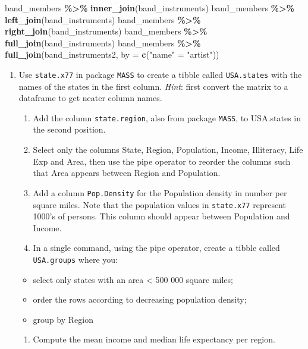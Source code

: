 \documentclass[
]{book}
\newenvironment{Shaded}{\begin{snugshade}}{\end{snugshade}}
\newcommand{\AttributeTok}[1]{\textcolor[rgb]{0.13,0.29,0.53}{#1}}
\newcommand{\FunctionTok}[1]{\textcolor[rgb]{0.13,0.29,0.53}{\textbf{#1}}}
\newcommand{\NormalTok}[1]{#1}
\newcommand{\OtherTok}[1]{\textcolor[rgb]{0.56,0.35,0.01}{#1}}
\newcommand{\SpecialCharTok}[1]{\textcolor[rgb]{0.81,0.36,0.00}{\textbf{#1}}}
\newcommand{\StringTok}[1]{\textcolor[rgb]{0.31,0.60,0.02}{#1}}
\providecommand{\tightlist}{%
  \setlength{\itemsep}{0pt}\setlength{\parskip}{0pt}}
\begin{document}
\begin{Shaded}
\begin{Highlighting}[]
\NormalTok{band\_members }\SpecialCharTok{\%\textgreater{}\%} \FunctionTok{inner\_join}\NormalTok{(band\_instruments)}
\NormalTok{band\_members }\SpecialCharTok{\%\textgreater{}\%} \FunctionTok{left\_join}\NormalTok{(band\_instruments)}
\NormalTok{band\_members }\SpecialCharTok{\%\textgreater{}\%} \FunctionTok{right\_join}\NormalTok{(band\_instruments)}
\NormalTok{band\_members }\SpecialCharTok{\%\textgreater{}\%} \FunctionTok{full\_join}\NormalTok{(band\_instruments)}
\NormalTok{band\_members }\SpecialCharTok{\%\textgreater{}\%} \FunctionTok{full\_join}\NormalTok{(band\_instruments2, }
                              \AttributeTok{by =} \FunctionTok{c}\NormalTok{(}\StringTok{"name"} \OtherTok{=} \StringTok{"artist"}\NormalTok{))}
\end{Highlighting}
\end{Shaded}

\begin{enumerate}
\def\labelenumi{\arabic{enumi}.}
\setcounter{enumi}{3}
\item
  Use \texttt{state.x77} in package \texttt{MASS} to create a tibble called \texttt{USA.states} with the names of the states in the first column. \emph{Hint}: first convert the matrix to a dataframe to get neater column names.

  \begin{enumerate}
  \def\labelenumii{(\alph{enumii})}
  \item
    Add the column \texttt{state.region}, also from package \texttt{MASS}, to USA.states in the second position.
  \item
    Select only the columns State, Region, Population, Income, Illiteracy, Life Exp and Area, then use the pipe operator to reorder the columns such that Area appears between Region and Population.
  \item
    Add a column \texttt{Pop.Density} for the Population density in number per square miles. Note that the population values in \texttt{state.x77} represent 1000's of persons. This column should appear between Population and Income.
  \item
    In a single command, using the pipe operator, create a tibble called \texttt{USA.groups} where you:
  \end{enumerate}

  \begin{itemize}
  \tightlist
  \item
    select only states with an area \textless{} 500 000 square miles;
  \item
    order the rows according to decreasing population density;
  \item
    group by Region
  \end{itemize}

  \begin{enumerate}
  \def\labelenumii{(\alph{enumii})}
  \setcounter{enumii}{4}
  \tightlist
  \item
    Compute the mean income and median life expectancy per region.
  \end{enumerate}
\end{enumerate}
\end{document}
